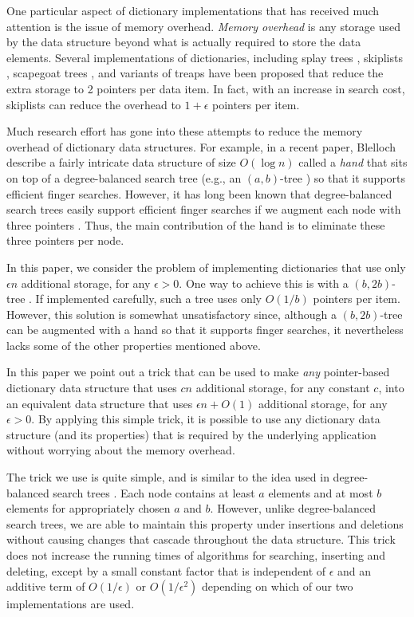 \documentclass[lotsofwhite]{patmorin}
\begin{document}
One particular aspect of dictionary implementations that has received
much attention is the issue of memory overhead.  \emph{Memory
overhead} is any storage used by the data structure beyond what is
actually required to store the data elements.  Several implementations
of dictionaries, including splay trees \cite{st85b}, skiplists
\cite{p90}, scapegoat trees \cite{gr93}, and variants of treaps
\cite{as96} have been proposed that reduce the extra storage to 2
pointers per data item.  In fact, with an increase in search cost,
skiplists can reduce the overhead to $1+\epsilon$ pointers per item.

Much research effort has gone into these attempts to reduce the memory
overhead of dictionary data structures.  For example, in a recent
paper, Blelloch \etal\ \cite{bmw03} describe a fairly intricate data
structure of size $O(\log n)$ called a \emph{hand} that sits on top of
a degree-balanced search tree (e.g., an $(a,b)$-tree \cite{hm82}) so
that it supports efficient finger searches.  However, it has long been
known that degree-balanced search trees easily support efficient
finger searches if we augment each node with three pointers
\cite{bt80}.  Thus, the main contribution of the hand is to eliminate
these three pointers per node.

In this paper, we consider the problem of implementing dictionaries
that use only $\epsilon n$ additional storage, for any $\epsilon>0$.
One way to achieve this is with a $(b,2b)$-tree \cite{hm82}.  If
implemented carefully, such a tree uses only $O(1/b)$ pointers per
item.  However, this solution is somewhat unsatisfactory since,
although a $(b,2b)$-tree can be augmented with a hand so that it
supports finger searches, it nevertheless lacks some of the other
properties mentioned above.

In this paper we point out a trick that can be used to make \emph{any}
pointer-based dictionary data structure that uses $cn$ additional
storage, for any constant $c$, into an equivalent data structure that
uses $\epsilon n + O(1)$ additional storage, for any $\epsilon>0$.  By
applying this simple trick, it is possible to use any dictionary data
structure (and its properties) that is required by the underlying
application without worrying about the memory overhead.

The trick we use is quite simple, and is similar to the idea used in
degree-balanced search trees \cite{hm82}.  Each node contains at least
$a$ elements and at most $b$ elements for appropriately chosen $a$ and
$b$.  However, unlike degree-balanced search trees, we are able to
maintain this property under insertions and deletions without causing
changes that cascade throughout the data structure.  This trick does
not increase the running times of algorithms for searching, inserting
and deleting, except by a small constant factor that is independent of
$\epsilon$ and an additive term of $O(1/\epsilon)$ or
$O(1/\epsilon^2)$ depending on which of our two implementations are
used.
\end{document}
